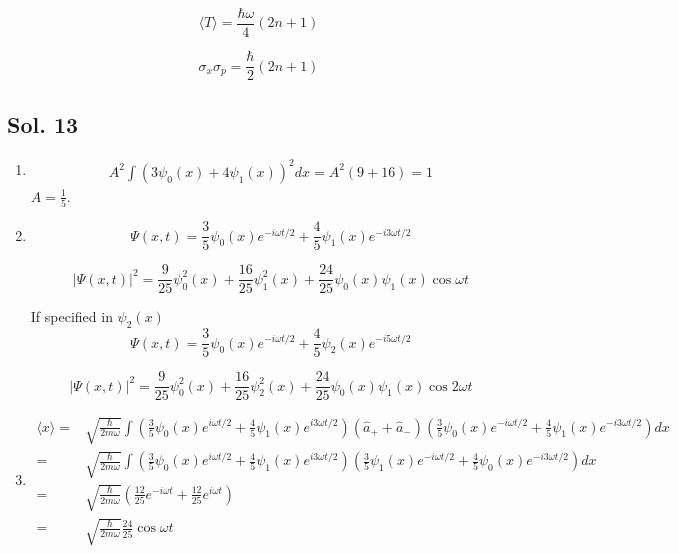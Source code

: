 $$\langle T\rangle = \frac{\hbar\omega}{4}(2n+1)$$

$$\sigma_x\sigma_p = \frac{\hbar}{2}(2n+1)$$

\subsection*{Sol. 13}
\begin{enumerate}
    \item 
    \begin{align*}
        A^2\int(3\psi_0(x)+4\psi_1(x))^2dx = 
        A^2(9+16) = 1
    \end{align*}
    $A= \frac{1}{5}.$
    \item 
    $$
    \Psi(x,t) = \frac{3}{5}\psi_0(x)e^{-i\omega t/2} + 
    \frac{4}{5}\psi_1(x)e^{-i3\omega t/2}
    $$

    $$
    |\Psi(x,t)|^2 = \frac{9}{25}\psi_0^2(x) + 
    \frac{16}{25}\psi_1^2(x) + 
    \frac{24}{25}\psi_0(x)\psi_1(x)\cos\omega t
    $$

    If specified in $\psi_2(x)$
    $$
    \Psi(x,t) = \frac{3}{5}\psi_0(x)e^{-i\omega t/2} + 
    \frac{4}{5}\psi_2(x)e^{-i5\omega t/2}
    $$

    $$
    |\Psi(x,t)|^2 = \frac{9}{25}\psi_0^2(x) + 
    \frac{16}{25}\psi_2^2(x) + 
    \frac{24}{25}\psi_0(x)\psi_1(x)\cos2\omega t
    $$

    \item 
    \begin{align*}
        \langle x\rangle
        = & \sqrt{\frac{\hbar}{2m\omega}}\int
        (\frac{3}{5}\psi_0(x)e^{i\omega t/2} + 
    \frac{4}{5}\psi_1(x)e^{i3\omega t/2})
    (\hat{a}_+ + \hat{a}_-)
    (\frac{3}{5}\psi_0(x)e^{-i\omega t/2} + 
    \frac{4}{5}\psi_1(x)e^{-i3\omega t/2})
    dx\\
    = & 
    \sqrt{\frac{\hbar}{2m\omega}}\int
        (\frac{3}{5}\psi_0(x)e^{i\omega t/2} + 
    \frac{4}{5}\psi_1(x)e^{i3\omega t/2})
    (\frac{3}{5}\psi_1(x)e^{-i\omega t/2} + 
    \frac{4}{5}\psi_0(x)e^{-i3\omega t/2})
    dx\\
    =& \sqrt{\frac{\hbar}{2m\omega}}
    (\frac{12}{25}e^{-i\omega t} + \frac{12}{25}e^{i\omega t})\\
    = & \sqrt{\frac{\hbar}{2m\omega}}\frac{24}{25}\cos\omega t
    \end{align*}


\end{enumerate}
